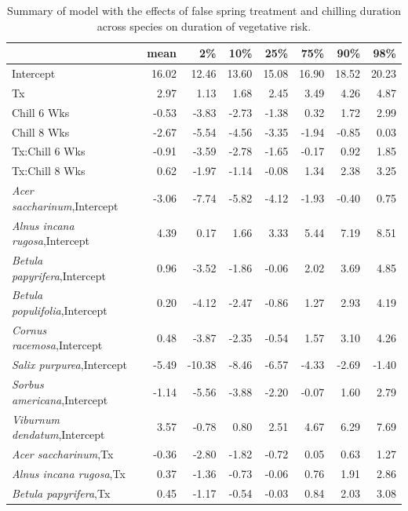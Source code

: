 \documentclass{article}\usepackage[]{graphicx}\usepackage[]{color}
\begin{document}
\newpage
\begin{longtable}{lrrrrrrr}
\caption{Summary of model with the effects of false spring treatment and chilling duration across species on duration of vegetative risk.} \\ 
  \hline
 & mean & 2\% & 10\% & 25\% & 75\% & 90\% & 98\% \\ 
  \hline \endhead  \hline
Intercept & 16.02 & 12.46 & 13.60 & 15.08 & 16.90 & 18.52 & 20.23 \\ 
  Tx & 2.97 & 1.13 & 1.68 & 2.45 & 3.49 & 4.26 & 4.87 \\ 
  Chill 6 Wks & -0.53 & -3.83 & -2.73 & -1.38 & 0.32 & 1.72 & 2.99 \\ 
  Chill 8 Wks & -2.67 & -5.54 & -4.56 & -3.35 & -1.94 & -0.85 & 0.03 \\ 
  Tx:Chill 6 Wks & -0.91 & -3.59 & -2.78 & -1.65 & -0.17 & 0.92 & 1.85 \\ 
  Tx:Chill 8 Wks & 0.62 & -1.97 & -1.14 & -0.08 & 1.34 & 2.38 & 3.25 \\ 
  \textit{Acer saccharinum},Intercept & -3.06 & -7.74 & -5.82 & -4.12 & -1.93 & -0.40 & 0.75 \\ 
  \textit{Alnus incana rugosa},Intercept & 4.39 & 0.17 & 1.66 & 3.33 & 5.44 & 7.19 & 8.51 \\ 
  \textit{Betula papyrifera},Intercept & 0.96 & -3.52 & -1.86 & -0.06 & 2.02 & 3.69 & 4.85 \\ 
  \textit{Betula populifolia},Intercept & 0.20 & -4.12 & -2.47 & -0.86 & 1.27 & 2.93 & 4.19 \\ 
  \textit{Cornus racemosa},Intercept & 0.48 & -3.87 & -2.35 & -0.54 & 1.57 & 3.10 & 4.26 \\ 
  \textit{Salix purpurea},Intercept & -5.49 & -10.38 & -8.46 & -6.57 & -4.33 & -2.69 & -1.40 \\ 
  \textit{Sorbus americana},Intercept & -1.14 & -5.56 & -3.88 & -2.20 & -0.07 & 1.60 & 2.79 \\ 
  \textit{Viburnum dendatum},Intercept & 3.57 & -0.78 & 0.80 & 2.51 & 4.67 & 6.29 & 7.69 \\ 
  \textit{Acer saccharinum},Tx & -0.36 & -2.80 & -1.82 & -0.72 & 0.05 & 0.63 & 1.27 \\ 
  \textit{Alnus incana rugosa},Tx & 0.37 & -1.36 & -0.73 & -0.06 & 0.76 & 1.91 & 2.86 \\ 
  \textit{Betula papyrifera},Tx & 0.45 & -1.17 & -0.54 & -0.03 & 0.84 & 2.03 & 3.08 \\ 

\end{longtable}
\end{document}
